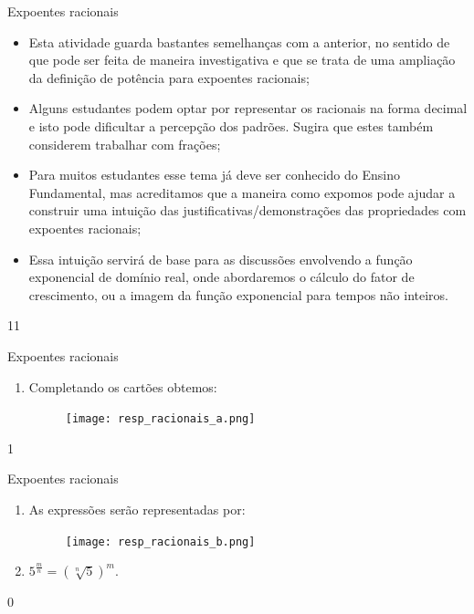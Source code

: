 \marginpar{\vspace{-2.5em}}
\begin{sugestions}{Expoentes racionais}
{
\begin{itemize}

\item Esta atividade guarda bastantes semelhanças com a anterior, no sentido de que pode ser feita de maneira investigativa e que se trata de uma ampliação da definição de potência para expoentes racionais;

\item Alguns estudantes podem optar por representar os racionais na forma decimal e isto pode dificultar a percepção dos padrões. Sugira que estes também considerem trabalhar com frações;

\item Para muitos estudantes esse tema já deve ser conhecido do Ensino Fundamental, mas acreditamos que a maneira como expomos pode ajudar a construir uma intuição das justificativas/demonstrações das propriedades com expoentes racionais;

\item Essa intuição servirá de base para as discussões envolvendo a função exponencial de domínio real, onde abordaremos o cálculo do fator de crescimento, ou a imagem da função exponencial para tempos não inteiros.

\end{itemize}
}{1}{1}
\end{sugestions}
\begin{answer}{Expoentes racionais}
{
\begin{enumerate}

\item Completando os cartões obtemos:

\begin{figure}[H]
\centering
\noindent\texttt{[image: resp\_racionais\_a.png]}
\end{figure}
\end{enumerate}
}{1}
\end{answer}
\begin{answer}{Expoentes racionais}
{
\begin{enumerate}
\item As expressões serão representadas por:

\begin{figure}[H]
\centering
\noindent\texttt{[image: resp\_racionais\_b.png]}
\end{figure}

\item $5^{\frac{m}{n}}=(\sqrt[n]{5})^{m}$.

\end{enumerate}
}{0}
\end{answer}

